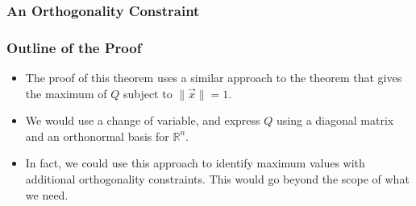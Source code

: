\begin{frame}\frametitle{An Orthogonality Constraint}
    
    \begin{center}\end{center}

\end{frame}

\begin{frame}\frametitle{Outline of the Proof}

    \begin{itemize}
        \item<2-> The proof of this theorem uses a similar approach to the theorem that gives the maximum of $Q$ subject to $\lVert \vec x \rVert = 1$. 
        \item<3-> We would use a change of variable, and express $Q$ using a diagonal matrix and an orthonormal basis for $\mathbb R^n$. 
        \item<4-> In fact, we could use this approach to identify maximum values with additional orthogonality constraints. This would go beyond the scope of what we need. 
    \end{itemize}
    
\end{frame}

